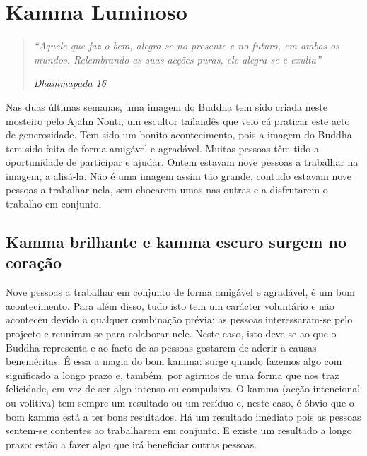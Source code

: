 
\chapter{Kamma Luminoso}


\begin{quote}

\emph{``Aquele que faz o bem, alegra-se no presente e no futuro, em ambos os mundos. Relembrando as suas acções puras, ele alegra-se e exulta''}

\href{https://suttacentral.net/dhp1-20/en/buddharakkhita}{\emph{Dhammapada 16}}

\end{quote}

Nas duas últimas semanas, uma imagem do Buddha tem sido criada neste mosteiro
pelo Ajahn Nonti, um escultor tailandês que veio cá praticar este acto de
generosidade. Tem sido um bonito acontecimento, pois a imagem do Buddha tem sido
feita de forma amigável e agradável. Muitas pessoas têm tido a oportunidade de
participar e ajudar. Ontem estavam nove pessoas a trabalhar na imagem, a
alisá-la. Não é uma imagem assim tão grande, contudo estavam nove pessoas a
trabalhar nela, sem chocarem umas nas outras e a disfrutarem o trabalho em
conjunto.

\section{Kamma brilhante e kamma escuro surgem no coração}

Nove pessoas a trabalhar em conjunto de forma amigável e agradável, é um bom
acontecimento. Para além disso, tudo isto tem um carácter voluntário e não
aconteceu devido a qualquer combinação prévia: as pessoas interessaram-se pelo
projecto e reuniram-se para colaborar nele. Neste caso, isto deve-se ao que o
Buddha representa e ao facto de as pessoas gostarem de aderir a causas
beneméritas. É essa a magia do bom kamma: surge quando fazemos algo com
significado a longo prazo e, também, por agirmos de uma forma que nos traz
felicidade, em vez de ser algo intenso ou compulsivo. O kamma (acção intencional
ou volitiva) tem sempre um resultado ou um resíduo e, neste caso, é óbvio que o
bom kamma está a ter bons resultados. Há um resultado imediato pois as pessoas
sentem-se contentes ao trabalharem em conjunto. E existe um resultado a longo
prazo: estão a fazer algo que irá beneficiar outras pessoas.

